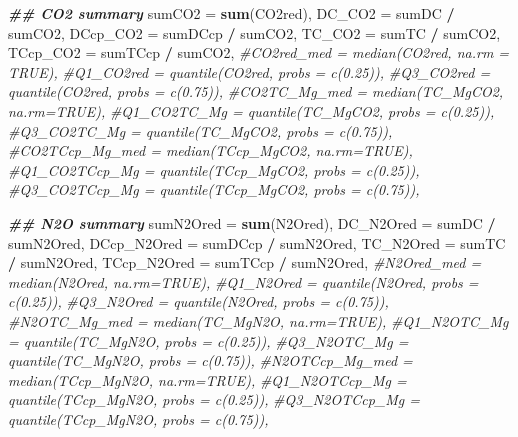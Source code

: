 \documentclass[
]{article}
\newenvironment{Shaded}{\begin{snugshade}}{\end{snugshade}}
\newcommand{\AttributeTok}[1]{\textcolor[rgb]{0.13,0.29,0.53}{#1}}
\newcommand{\CommentTok}[1]{\textcolor[rgb]{0.56,0.35,0.01}{\textit{#1}}}
\newcommand{\DocumentationTok}[1]{\textcolor[rgb]{0.56,0.35,0.01}{\textbf{\textit{#1}}}}
\newcommand{\FunctionTok}[1]{\textcolor[rgb]{0.13,0.29,0.53}{\textbf{#1}}}
\newcommand{\NormalTok}[1]{#1}
\newcommand{\SpecialCharTok}[1]{\textcolor[rgb]{0.81,0.36,0.00}{\textbf{#1}}}
\begin{document}
\begin{Shaded}
\begin{Highlighting}[]
            \DocumentationTok{\#\# CO2 summary}
            \AttributeTok{sumCO2 =} \FunctionTok{sum}\NormalTok{(CO2red),}
            \AttributeTok{DC\_CO2 =}\NormalTok{ sumDC }\SpecialCharTok{/}\NormalTok{ sumCO2,}
            \AttributeTok{DCcp\_CO2 =}\NormalTok{ sumDCcp }\SpecialCharTok{/}\NormalTok{ sumCO2,}
            \AttributeTok{TC\_CO2 =}\NormalTok{ sumTC }\SpecialCharTok{/}\NormalTok{ sumCO2,}
            \AttributeTok{TCcp\_CO2 =}\NormalTok{ sumTCcp }\SpecialCharTok{/}\NormalTok{ sumCO2,}
            \CommentTok{\#CO2red\_med = median(CO2red, na.rm = TRUE),}
            \CommentTok{\#Q1\_CO2red = quantile(CO2red, probs = c(0.25)),}
            \CommentTok{\#Q3\_CO2red = quantile(CO2red, probs = c(0.75)),}
            \CommentTok{\#CO2TC\_Mg\_med = median(TC\_MgCO2, na.rm=TRUE),}
            \CommentTok{\#Q1\_CO2TC\_Mg = quantile(TC\_MgCO2, probs = c(0.25)),}
            \CommentTok{\#Q3\_CO2TC\_Mg = quantile(TC\_MgCO2, probs = c(0.75)),}
            \CommentTok{\#CO2TCcp\_Mg\_med = median(TCcp\_MgCO2, na.rm=TRUE),}
            \CommentTok{\#Q1\_CO2TCcp\_Mg = quantile(TCcp\_MgCO2, probs = c(0.25)),}
            \CommentTok{\#Q3\_CO2TCcp\_Mg = quantile(TCcp\_MgCO2, probs = c(0.75)),}
            
            \DocumentationTok{\#\# N2O summary}
            \AttributeTok{sumN2Ored =} \FunctionTok{sum}\NormalTok{(N2Ored),}
            \AttributeTok{DC\_N2Ored =}\NormalTok{ sumDC }\SpecialCharTok{/}\NormalTok{ sumN2Ored,}
            \AttributeTok{DCcp\_N2Ored =}\NormalTok{ sumDCcp }\SpecialCharTok{/}\NormalTok{ sumN2Ored,}
            \AttributeTok{TC\_N2Ored =}\NormalTok{ sumTC }\SpecialCharTok{/}\NormalTok{ sumN2Ored,}
            \AttributeTok{TCcp\_N2Ored =}\NormalTok{ sumTCcp }\SpecialCharTok{/}\NormalTok{ sumN2Ored,}
            \CommentTok{\#N2Ored\_med = median(N2Ored, na.rm=TRUE),}
            \CommentTok{\#Q1\_N2Ored = quantile(N2Ored, probs = c(0.25)),}
            \CommentTok{\#Q3\_N2Ored = quantile(N2Ored, probs = c(0.75)),}
            \CommentTok{\#N2OTC\_Mg\_med = median(TC\_MgN2O, na.rm=TRUE),}
            \CommentTok{\#Q1\_N2OTC\_Mg = quantile(TC\_MgN2O, probs = c(0.25)),}
            \CommentTok{\#Q3\_N2OTC\_Mg = quantile(TC\_MgN2O, probs = c(0.75)),}
            \CommentTok{\#N2OTCcp\_Mg\_med = median(TCcp\_MgN2O, na.rm=TRUE),}
            \CommentTok{\#Q1\_N2OTCcp\_Mg = quantile(TCcp\_MgN2O, probs = c(0.25)),}
            \CommentTok{\#Q3\_N2OTCcp\_Mg = quantile(TCcp\_MgN2O, probs = c(0.75)),}
            

\end{Highlighting}
\end{Shaded}
\end{document}
